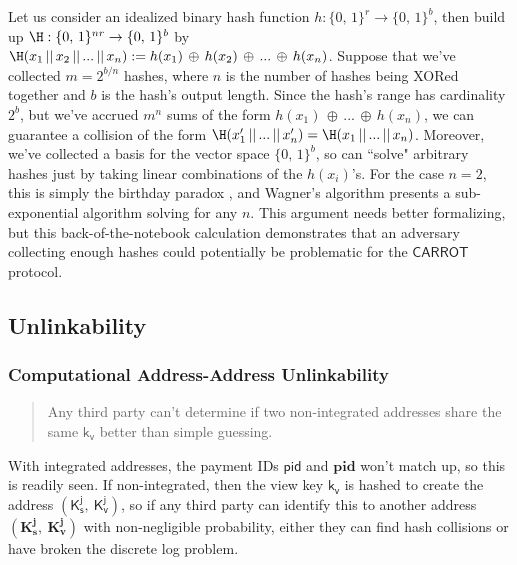 \documentclass{article}
\theoremstyle{definition}
\newcommand{\6}{\mathbf}
\newcommand{\7}{\mathcal}
\newcommand{\rar}{\rightarrow}
\renewcommand{\sf}[1]{{\mathsf{#1}}}
\newcommand{\sfb}[1]{{\mathsf{\mathbf{#1}}}}
\newcommand{\carr}{$\sf{CARROT}$ }
\begin{document}
Let us consider an idealized binary hash function $h : \{0, \, 1\}^r \rar \{0, \, 1\}^b$, then build up $\H : \{0, \, 1\}^{nr} \rar \{0, \, 1\}^b$ by $\H(x_1 \, || \, x_2 \, || \, ... \, || \, x_n) := h(x_1) \, \oplus \, h(x_2) \, \oplus \, ... \, \oplus \, h(x_n)$. 
Suppose that we've collected $m=2^{b/n}$ hashes, where $n$ is the number of hashes being XORed together and $b$ is the hash's output length. 
Since the hash's range has cardinality $2^b$, but we've accrued $m^n$ sums of the form $h(x_1) \, \oplus \, ... \, \oplus \, h(x_n)$, we can guarantee a collision of the form $\H(x_1' \, || \, ... \, || \, x_n') = \H(x_1 \, || \, ... \, || \, x_n)$. 
Moreover, we've collected a basis for the vector space $\{0, \, 1\}^b$, so can ``solve" arbitrary hashes just by taking linear combinations of the $h(x_i)$'s. 
For the case $n=2$, this is simply the birthday paradox \cite{Birthday}, and Wagner's algorithm \cite{Wagner} presents a sub-exponential algorithm solving for any $n$.
This argument needs better formalizing, but this back-of-the-notebook calculation demonstrates that an adversary collecting enough hashes could potentially be problematic for the \carr protocol.








\subsection{Unlinkability}


\subsubsection{Computational Address-Address Unlinkability} 

\begin{quote}
        Any third party can't determine if two non-integrated addresses share the same $\sf{k_v}$ better than simple guessing.
\end{quote}

With integrated addresses, the payment IDs $\sf{pid}$ and $\sfb{pid}$ won't match up, so this is readily seen. If non-integrated, then the view key $\sf{k_v}$ is hashed to create the address $(\sf{K_s^j}, \ \sf{K_v^j})$, so if any third party can identify this to another address $(\sfb{K_s^j}, \ \sfb{K_v^j})$ with non-negligible probability, either they can find hash collisions or have broken the discrete log problem.
\end{document}
